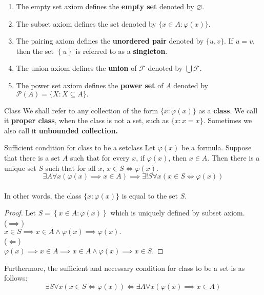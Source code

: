 \begin{remarks}
    \begin{enumerate}
        \item The empty set axiom defines the \textbf{empty set} denoted by $\varnothing$.
        \item The subset axiom defines the set denoted by $\{x \in A:\varphi(x)\}$.
        \item The pairing axiom defines the \textbf{unordered pair} denoted by $\{u, v\}$. If $u = v$, then the set $\left\{u\right\}$ is referred to as a \textbf{singleton}.
        \item The union axiom defines the \textbf{union} of $\mathcal{F}$ denoted by $\bigcup \mathcal{F}$.
        \item The power set axiom defines the \textbf{power set} of $A$ denoted by $\mathcal{P}(A) = \{X:X \subseteq A\}.$
    \end{enumerate}
\end{remarks}

\begin{definition}{Class}{}
    We shall refer to any collection of the form $\{x:\varphi(x)\}$ as a \textbf{class}. We call it \textbf{proper class}, 
    when the class is not a set, such as $\{x:x=x\}$. Sometimes we also call it \textbf{unbounded collection.}
\end{definition}

\begin{theorem}{Sufficient condition for class to be a set}{class}
    Let $\varphi(x)$ be a formula. Suppose that there is a set $A$ such that for every $x$, if $\varphi(x)$, then $x \in A$. Then there is a unique set $S$ such that for all $x$, $x \in S \iff \varphi(x)$.\\
    \begin{equation*}
        \exists A \forall x (\varphi(x) \implies x \in A) \implies  \exists ! S \forall x(x \in S \iff \varphi(x))
    \end{equation*}
    \\
    In other words, the class $\{x:\varphi(x)\}$ is equal to the set $S$.
\end{theorem}

\begin{proof}
    Let $S = \left\{x \in A \colon \varphi(x) \right\}$ which is uniquely defined by subset axiom.\\
    ($ \implies $)\\
    $x \in S \implies x \in A \land \varphi(x) \implies \varphi(x).$\\
    ($ \Leftarrow $)\\
    $\varphi(x) \implies x \in A \implies x \in A \land \varphi(x) \implies x \in S.$
\end{proof}
\begin{remarks} 
    Furthermore, the sufficient and necessary condition for class to be a set is as follows:
    \begin{equation*}
        \exists S \forall x(x \in S \iff \varphi(x)) \iff \exists A \forall x(\varphi(x) \implies x \in A)
    \end{equation*}
\end{remarks}

